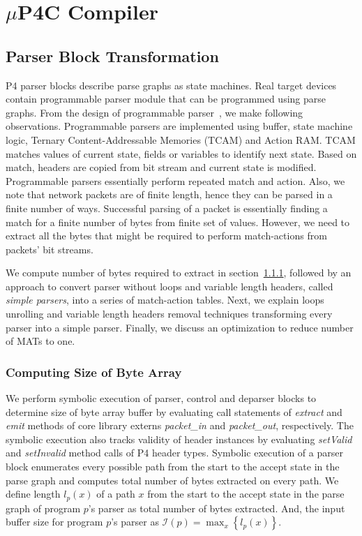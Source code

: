\section{$\mu$P4C Compiler}
\label{section-mp4c-compiler}


\subsection{Parser Block Transformation}
\label{subsection:parser-block-transformation}
P4 parser blocks describe parse graphs as state machines.
Real target devices contain programmable parser module that can be programmed using parse graphs.
From the design of programmable parser~\cite{6665172}, we make following observations.
Programmable parsers are implemented using buffer, state machine logic, Ternary Content-Addressable Memories (TCAM) and Action RAM. 
TCAM matches values of current state, fields or variables to identify next state. 
Based on match, headers are copied from bit stream and current state is modified.
Programmable parsers essentially perform repeated match and action.
Also, we note that network packets are of finite length, hence they can be parsed in a finite number of ways.
Successful parsing of a packet is essentially finding a match for a finite number of bytes from finite set of values.
However, we need to extract all the bytes that might be required to perform match-actions from packets' bit streams.


We compute number of bytes required to extract in section~\ref{subsubsection:computing-size-of-byte-array}, followed by an approach to convert parser without loops and variable length headers, called \textit{simple parsers}, into a series of match-action tables.
Next, we explain loops unrolling and variable length headers removal techniques transforming every parser into a simple parser.
Finally, we discuss an optimization to reduce number of MATs to one.


\subsubsection{Computing Size of Byte Array}
\label{subsubsection:computing-size-of-byte-array}
We perform symbolic execution of parser, control and deparser blocks to determine size of byte array buffer by evaluating call statements of \emph{extract} and \emph{emit} methods of core library externs \emph{packet\_in} and \emph{packet\_out}, respectively.
The symbolic execution also tracks validity of header instances by evaluating \emph{setValid} and \emph{setInvalid} method calls of P4 header types.
Symbolic execution of a parser block enumerates every possible path from the start to the accept state in the parse graph and computes total number of bytes extracted on every path.
We define length $l_{p}(x)$ of a path $x$ from the start to the accept state in the parse graph of program $p$'s parser as total number of bytes extracted.
And, the input buffer size for program $p$'s parser as $\mathcal{I}(p) = \max_{x}\left\{l_{p}(x)\right\}$. 


